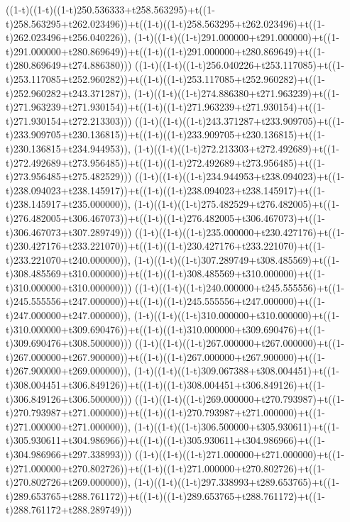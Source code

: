 ((1-t)((1-t)((1-t)250.536333+t258.563295)+t((1-t)258.563295+t262.023496))+t((1-t)((1-t)258.563295+t262.023496)+t((1-t)262.023496+t256.040226)),                                     (1-t)((1-t)((1-t)291.000000+t291.000000)+t((1-t)291.000000+t280.869649))+t((1-t)((1-t)291.000000+t280.869649)+t((1-t)280.869649+t274.886380)))
((1-t)((1-t)((1-t)256.040226+t253.117085)+t((1-t)253.117085+t252.960282))+t((1-t)((1-t)253.117085+t252.960282)+t((1-t)252.960282+t243.371287)),                                     (1-t)((1-t)((1-t)274.886380+t271.963239)+t((1-t)271.963239+t271.930154))+t((1-t)((1-t)271.963239+t271.930154)+t((1-t)271.930154+t272.213303)))
((1-t)((1-t)((1-t)243.371287+t233.909705)+t((1-t)233.909705+t230.136815))+t((1-t)((1-t)233.909705+t230.136815)+t((1-t)230.136815+t234.944953)),                                     (1-t)((1-t)((1-t)272.213303+t272.492689)+t((1-t)272.492689+t273.956485))+t((1-t)((1-t)272.492689+t273.956485)+t((1-t)273.956485+t275.482529)))
((1-t)((1-t)((1-t)234.944953+t238.094023)+t((1-t)238.094023+t238.145917))+t((1-t)((1-t)238.094023+t238.145917)+t((1-t)238.145917+t235.000000)),                                     (1-t)((1-t)((1-t)275.482529+t276.482005)+t((1-t)276.482005+t306.467073))+t((1-t)((1-t)276.482005+t306.467073)+t((1-t)306.467073+t307.289749)))
((1-t)((1-t)((1-t)235.000000+t230.427176)+t((1-t)230.427176+t233.221070))+t((1-t)((1-t)230.427176+t233.221070)+t((1-t)233.221070+t240.000000)),                                     (1-t)((1-t)((1-t)307.289749+t308.485569)+t((1-t)308.485569+t310.000000))+t((1-t)((1-t)308.485569+t310.000000)+t((1-t)310.000000+t310.000000)))
((1-t)((1-t)((1-t)240.000000+t245.555556)+t((1-t)245.555556+t247.000000))+t((1-t)((1-t)245.555556+t247.000000)+t((1-t)247.000000+t247.000000)),                                     (1-t)((1-t)((1-t)310.000000+t310.000000)+t((1-t)310.000000+t309.690476))+t((1-t)((1-t)310.000000+t309.690476)+t((1-t)309.690476+t308.500000)))
((1-t)((1-t)((1-t)267.000000+t267.000000)+t((1-t)267.000000+t267.900000))+t((1-t)((1-t)267.000000+t267.900000)+t((1-t)267.900000+t269.000000)),                                     (1-t)((1-t)((1-t)309.067388+t308.004451)+t((1-t)308.004451+t306.849126))+t((1-t)((1-t)308.004451+t306.849126)+t((1-t)306.849126+t306.500000)))
((1-t)((1-t)((1-t)269.000000+t270.793987)+t((1-t)270.793987+t271.000000))+t((1-t)((1-t)270.793987+t271.000000)+t((1-t)271.000000+t271.000000)),                                     (1-t)((1-t)((1-t)306.500000+t305.930611)+t((1-t)305.930611+t304.986966))+t((1-t)((1-t)305.930611+t304.986966)+t((1-t)304.986966+t297.338993)))
((1-t)((1-t)((1-t)271.000000+t271.000000)+t((1-t)271.000000+t270.802726))+t((1-t)((1-t)271.000000+t270.802726)+t((1-t)270.802726+t269.000000)),                                     (1-t)((1-t)((1-t)297.338993+t289.653765)+t((1-t)289.653765+t288.761172))+t((1-t)((1-t)289.653765+t288.761172)+t((1-t)288.761172+t288.289749)))
